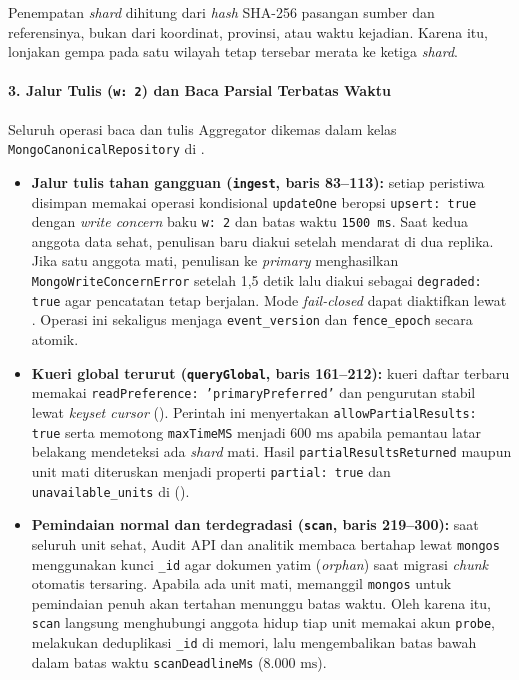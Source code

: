 Penempatan \textit{shard} dihitung dari \textit{hash} SHA-256 pasangan sumber dan referensinya, bukan dari koordinat, provinsi, atau waktu kejadian. Karena itu, lonjakan gempa pada satu wilayah tetap tersebar merata ke ketiga \textit{shard}.

\paragraph*{3. Jalur Tulis (\texttt{w: 2}) dan Baca Parsial Terbatas Waktu}
Seluruh operasi baca dan tulis Aggregator dikemas dalam kelas \texttt{MongoCanonicalRepository} di .

\begin{itemize}
  \item \textbf{Jalur tulis tahan gangguan (\texttt{ingest}, baris 83--113):} setiap peristiwa disimpan memakai operasi kondisional \texttt{updateOne} beropsi \texttt{upsert: true} dengan \textit{write concern} baku \texttt{w: 2} dan batas waktu \texttt{1500 ms}. Saat kedua anggota data sehat, penulisan baru diakui setelah mendarat di dua replika. Jika satu anggota mati, penulisan ke \textit{primary} menghasilkan \texttt{MongoWriteConcernError} setelah 1,5 detik lalu diakui sebagai \texttt{degraded: true} agar pencatatan tetap berjalan. Mode \textit{fail-closed} dapat diaktifkan lewat . Operasi ini sekaligus menjaga \texttt{event\_version} dan \texttt{fence\_epoch} secara atomik.
  \item \textbf{Kueri global terurut (\texttt{queryGlobal}, baris 161--212):} kueri daftar terbaru memakai \texttt{readPreference: 'primaryPreferred'} dan pengurutan stabil lewat \textit{keyset cursor} (). Perintah ini menyertakan \texttt{allowPartialResults: true} serta memotong \texttt{maxTimeMS} menjadi $600\text{ ms}$ apabila pemantau latar belakang mendeteksi ada \textit{shard} mati. Hasil \texttt{partialResultsReturned} maupun unit mati diteruskan menjadi properti \texttt{partial: true} dan \texttt{unavailable\_units} di  ().
  \item \textbf{Pemindaian normal dan terdegradasi (\texttt{scan}, baris 219--300):} saat seluruh unit sehat, Audit API dan analitik membaca bertahap lewat \texttt{mongos} menggunakan kunci \texttt{\_id} agar dokumen yatim (\textit{orphan}) saat migrasi \textit{chunk} otomatis tersaring. Apabila ada unit mati, memanggil \texttt{mongos} untuk pemindaian penuh akan tertahan menunggu batas waktu. Oleh karena itu, \texttt{scan} langsung menghubungi anggota hidup tiap unit memakai akun \texttt{probe}, melakukan deduplikasi \texttt{\_id} di memori, lalu mengembalikan batas bawah dalam batas waktu \texttt{scanDeadlineMs} ($8.000\text{ ms}$).
\end{itemize}

